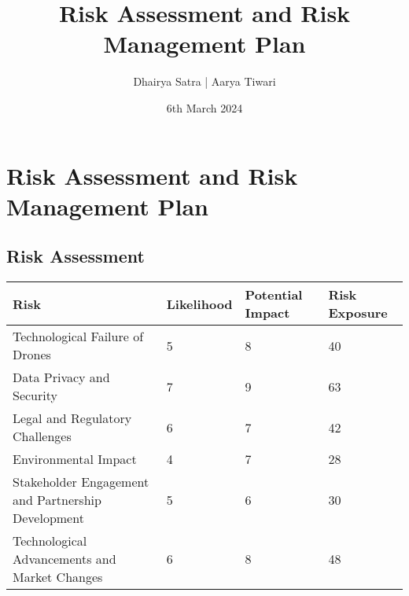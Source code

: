 \documentclass{article}
\title{Risk Assessment and Risk Management Plan}
\author{Dhairya Satra | Aarya Tiwari}
\date{6th March 2024}
\begin{document}
\maketitle

\section*{Risk Assessment and Risk Management Plan}

\subsection*{Risk Assessment}
\begin{tabularx}{\textwidth}{|X|X|X|X|}
\hline
\textbf{Risk} & \textbf{Likelihood} & \textbf{Potential Impact} & \textbf{Risk Exposure} \\
\hline
Technological Failure of Drones & 5 & 8 & 40 \\
Data Privacy and Security & 7 & 9 & 63 \\
Legal and Regulatory Challenges & 6 & 7 & 42 \\
Environmental Impact & 4 & 7 & 28 \\
Stakeholder Engagement and Partnership Development & 5 & 6 & 30 \\
Technological Advancements and Market Changes & 6 & 8 & 48 \\
\hline
\end{tabularx}
\end{document}
